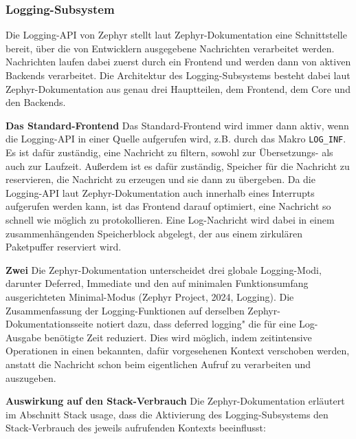 \subsubsection{Logging-Subsystem}
Die Logging-API von Zephyr stellt laut Zephyr-Dokumentation eine Schnittstelle bereit, {\"u}ber die von Entwicklern ausgegebene Nachrichten verarbeitet werden. Nachrichten laufen dabei zuerst durch ein Frontend und werden dann von aktiven Backends verarbeitet. Die Architektur des Logging-Subsystems besteht dabei laut Zephyr-Dokumentation aus genau drei Hauptteilen, dem Frontend, dem Core und den Backends.

\textbf{Das Standard-Frontend} Das Standard-Frontend wird immer dann aktiv, wenn die Logging-API in einer Quelle aufgerufen wird, z.B. durch das Makro \lstinline[style=fileinline]|LOG_INF|. Es ist daf{\"u}r zust{\"a}ndig, eine Nachricht zu filtern, sowohl zur {\"U}bersetzungs- als auch zur Laufzeit. Au{\ss}erdem ist es daf{\"u}r zust{\"a}ndig, Speicher f{\"u}r die Nachricht zu reservieren, die Nachricht zu erzeugen und sie dann zu {\"u}bergeben. Da die Logging-API laut Zephyr-Dokumentation auch innerhalb eines Interrupts aufgerufen werden kann, ist das Frontend darauf optimiert, eine Nachricht so schnell wie m{\"o}glich zu protokollieren. Eine Log-Nachricht wird dabei in einem zusammenh{\"a}ngenden Speicherblock abgelegt, der aus einem \glqq{}zirkul{\"a}ren Paketpuffer\grqq{} reserviert wird.

\textbf{Zwei }Die Zephyr-Dokumentation unterscheidet drei globale Logging-Modi, darunter Deferred, Immediate und den auf minimalen Funktionsumfang ausgerichteten Minimal-Modus (Zephyr Project, 2024, \glqq{}Logging\grqq{}). Die Zusammenfassung der Logging-Funktionen auf derselben Zephyr-Dokumentationsseite notiert dazu, dass \glqq{}deferred logging" die f{\"u}r eine Log-Ausgabe ben{\"o}tigte Zeit reduziert. Dies wird m{\"o}glich, indem zeitintensive Operationen in einen bekannten, daf{\"u}r vorgesehenen Kontext verschoben werden, anstatt die Nachricht schon beim eigentlichen Aufruf zu verarbeiten und auszugeben.

\textbf{Auswirkung auf den Stack-Verbrauch} Die Zephyr-Dokumentation erl{\"a}utert im Abschnitt \glqq{}Stack usage\grqq{}, dass die Aktivierung des Logging-Subsystems den Stack-Verbrauch des jeweils aufrufenden Kontexts beeinflusst:

